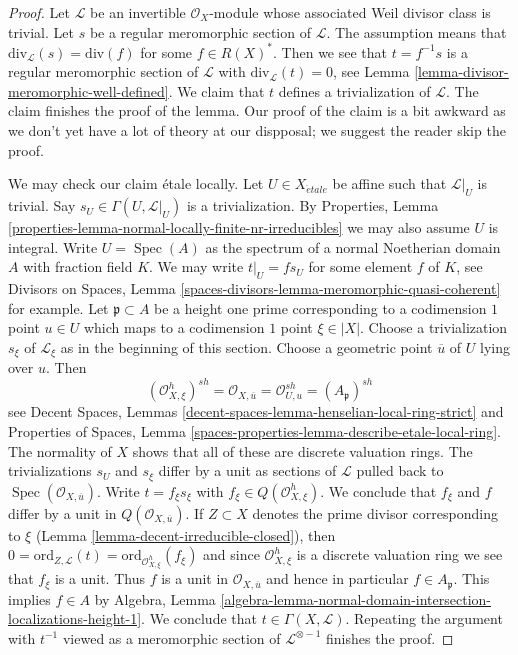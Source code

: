 \documentclass[10pt,a4paper]{amsart}
\theoremstyle{plain}
\theoremstyle{definition}
\theoremstyle{remark}
\numberwithin{equation}{subsection}
\def\Spec{\mathop{\mathrm{Spec}}}
\def\etale{{\acute{e}tale}}
\begin{document}
\begin{proof}
Let $\mathcal{L}$ be an invertible $\mathcal{O}_X$-module whose
associated Weil divisor class is trivial. Let $s$ be a regular
meromorphic section of $\mathcal{L}$. The assumption means that
$\text{div}_\mathcal{L}(s) = \text{div}(f)$ for some
$f \in R(X)^*$. Then we see that $t = f^{-1}s$ is a regular
meromorphic section of $\mathcal{L}$ with
$\text{div}_\mathcal{L}(t) = 0$, see
Lemma \ref{lemma-divisor-meromorphic-well-defined}.
We claim that $t$ defines a trivialization of $\mathcal{L}$.
The claim finishes the proof of the lemma.
Our proof of the claim is a bit awkward as we
don't yet have a lot of theory at our dispposal; we suggest
the reader skip the proof.

\medskip\noindent
We may check our claim \'etale locally. Let $U \in X_\etale$ be affine
such that $\mathcal{L}|_U$ is trivial. Say $s_U \in \Gamma(U, \mathcal{L}|_U)$
is a trivialization. By
Properties, Lemma \ref{properties-lemma-normal-locally-finite-nr-irreducibles}
we may also assume $U$ is integral. Write $U = \Spec(A)$ as the spectrum of a
normal Noetherian domain $A$ with fraction field $K$.
We may write $t|_U = f s_U$ for some element $f$ of $K$, see
Divisors on Spaces, Lemma \ref{spaces-divisors-lemma-meromorphic-quasi-coherent}
for example. Let $\mathfrak p \subset A$ be a height one prime
corresponding to a codimension $1$ point $u \in U$ which maps
to a codimension $1$ point $\xi \in |X|$. Choose a trivialization
$s_\xi$ of $\mathcal{L}_\xi$ as in the beginning of this section.
Choose a geometric point $\overline{u}$ of $U$ lying over $u$.
Then
$$
(\mathcal{O}_{X, \xi}^h)^{sh} =
\mathcal{O}_{X, \overline{u}} =
\mathcal{O}_{U, u}^{sh} = (A_\mathfrak p)^{sh}
$$
see Decent Spaces, Lemmas
\ref{decent-spaces-lemma-henselian-local-ring-strict}
and
Properties of Spaces, Lemma
\ref{spaces-properties-lemma-describe-etale-local-ring}.
The normality of $X$ shows that all of these are
discrete valuation rings. The trivializations $s_U$ and $s_\xi$
differ by a unit as sections of $\mathcal{L}$ pulled back to
$\Spec(\mathcal{O}_{X, \overline{u}})$.
Write $t = f_\xi s_\xi$ with $f_\xi \in Q(\mathcal{O}_{X, \xi}^h)$.
We conclude that $f_\xi$ and $f$ differ by a unit
in $Q(\mathcal{O}_{X, \overline{u}})$.
If $Z \subset X$ denotes the prime divisor corresponding to $\xi$
(Lemma \ref{lemma-decent-irreducible-closed}), then
$0 = \text{ord}_{Z, \mathcal{L}}(t) =
\text{ord}_{\mathcal{O}_{X, \xi}^h}(f_\xi)$
and since $\mathcal{O}_{X, \xi}^h$ is a discrete valuation ring
we see that $f_\xi$ is a unit.
Thus $f$ is a unit in $\mathcal{O}_{X, \overline{u}}$
and hence in particular $f \in A_\mathfrak p$.
This implies $f \in A$ by Algebra, Lemma
\ref{algebra-lemma-normal-domain-intersection-localizations-height-1}.
We conclude that $t \in \Gamma(X, \mathcal{L})$.
Repeating the argument with $t^{-1}$ viewed as a meromorphic
section of $\mathcal{L}^{\otimes -1}$ finishes the proof.
\end{proof}
\end{document}
